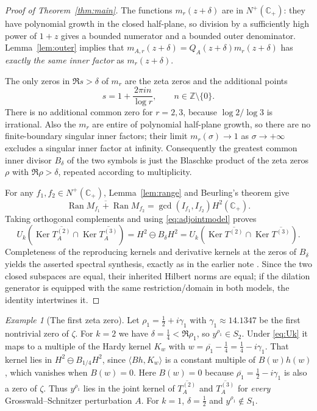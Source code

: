\documentclass[12pt,letterpaper]{article}
\theoremstyle{remark}
\newtheorem{example}[theorem]{Example}
\numberwithin{equation}{section}
\newcommand{\C}{\mathbb C}
\newcommand{\Ker}{\operatorname{Ker}}
\newcommand{\ran}{\operatorname{Ran}}
\newcommand{\Nplus}{N^+(\C_+)}
\begin{document}
\begin{proof}[Proof of Theorem~\ref{thm:main}]
The functions $m_r(z+\delta)$ are in $\Nplus$: they have polynomial growth in the closed half-plane, so division by a sufficiently high power of $1+z$ gives a bounded numerator and a bounded outer denominator. Lemma~\ref{lem:outer} implies that $m_{A,r}(z+\delta)=Q_A(z+\delta)m_r(z+\delta)$ has \emph{exactly the same inner factor} as $m_r(z+\delta)$.

The only zeros in $\Re s>\delta$ of $m_r$ are the zeta zeros and the additional points
\[
 s=1+\frac{2\pi i n}{\log r},\qquad n\in\mathbb Z\setminus\{0\}.
\]
There is no additional common zero for $r=2,3$, because $\log2/\log3$ is irrational. Also the $m_r$ are entire of polynomial half-plane growth, so there are no finite-boundary singular inner factors; their limit $m_r(\sigma)\to1$ as $\sigma\to+\infty$ excludes a singular inner factor at infinity. Consequently the greatest common inner divisor $B_\delta$ of the two symbols is just the Blaschke product of the zeta zeros $\rho$ with $\Re\rho>\delta$, repeated according to multiplicity.

For any $f_1,f_2\in\Nplus$, Lemma~\ref{lem:range} and Beurling's theorem give
\[
 \overline{\ran M_{f_1}+\ran M_{f_2}}
 =\gcd(I_{f_1},I_{f_2})H^2(\C_+).
\]
Taking orthogonal complements and using \eqref{eq:adjointmodel} proves
\[
 U_k\left(\Ker\overline{T_A^{(2)}}\cap\Ker\overline{T_A^{(3)}}\right)
 =H^2\ominus B_\delta H^2
 =U_k\left(\Ker\overline{T^{(2)}}\cap\Ker\overline{T^{(3)}}\right).
\]
Completeness of the reproducing kernels and derivative kernels at the zeros of $B_\delta$ yields the asserted spectral synthesis, exactly as in the earlier note \cite{JoynerNote}. Since the two closed subspaces are equal, their inherited Hilbert norms are equal; if the dilation generator is equipped with the same restriction/domain in both models, the identity intertwines it.
\end{proof}

\begin{example}[The first zeta zero]\label{ex:first-zero}
Let $\rho_1=\tfrac12+i\gamma_1$ with $\gamma_1\approx14.1347$ be the
first nontrivial zero of $\zeta$.  For $k=2$ we have $\delta=\tfrac14<\Re\rho_1$,
so $y^{\rho_1}\in S_2$.  Under \eqref{eq:Uk} it maps to a multiple of the
Hardy kernel $K_w$ with $w=\overline{\rho_1}-\tfrac14=\tfrac14-i\gamma_1$.
That kernel lies in $H^2\ominus B_{1/4}H^2$, since $\langle Bh,K_w\rangle$ is a
constant multiple of $B(w)h(w)$, which vanishes when $B(w)=0$.  Here $B(w)=0$ because $\overline{\rho_1}=\tfrac12-i\gamma_1$ is
also a zero of $\zeta$.  Thus $y^{\rho_1}$ lies in the joint kernel of
$\overline{T_A^{(2)}}$ and $\overline{T_A^{(3)}}$ for \emph{every}
Grosswald--Schnitzer perturbation $A$.  For $k=1$, $\delta=\tfrac12$ and
$y^{\rho_1}\notin S_1$.
\end{example}
\end{document}
